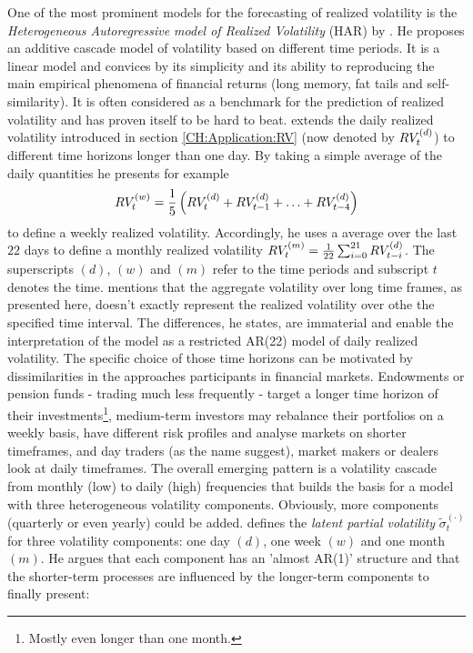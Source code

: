 One of the most prominent models for the forecasting of realized volatility is the \textit{Heterogeneous Autoregressive model of Realized Volatility} (HAR) by \cite{Corsi2009}. He proposes an additive cascade model of volatility based on different time periods. It is a linear model and convices by its simplicity and its ability to reproducing the main empirical phenomena of financial returns (long memory, fat tails and self-similarity). It is often considered as a benchmark for the prediction of realized volatility and has proven itself to be hard to beat. \cite{Corsi2009} extends the daily realized volatility introduced in section \ref{CH:Application:RV} (now denoted by $RV^{(d)}_t$) to different time horizons longer than one day. By taking a simple average of the daily quantities he presents for example
\begin{equation}
    RV^{(w)}_t = \frac{1}{5}\left(RV^{(d)}_t + RV^{(d)}_{t-1} + \hdots + RV^{(d)}_{t-4}\right)
\end{equation}
to define a weekly realized volatility. Accordingly, he uses a average over the last $22$ days to define a monthly realized volatility $RV^{(m)}_t = \frac{1}{22}\sum_{i=0}^{21} RV^{(d)}_{t-i}$. The superscripts $(d)$, $(w)$ and $(m)$ refer to the time periods and subscript $t$ denotes the time. \cite{Corsi2009} mentions that the aggregate volatility over long time frames, as presented here, doesn't exactly represent the realized volatility over othe the specified time interval. The differences, he states, are immaterial and enable the interpretation of the model as a restricted AR(22) model of daily realized volatility. The specific choice of those time horizons can be motivated by dissimilarities in the approaches participants in financial markets. Endowments or pension funds - trading much less frequently - target a longer time horizon of their investments\footnote{Mostly even longer than one month.}, medium-term investors may rebalance their portfolios on a weekly basis, have different risk profiles and analyse markets on shorter timeframes, and day traders (as the name suggest), market makers or dealers look at daily timeframes. 
The overall emerging pattern is a volatility cascade from monthly (low) to daily (high) frequencies that builds the basis for a model with three heterogeneous volatility components.
Obviously, more components (quarterly or even yearly) could be added.
\cite{Corsi2009} defines the \textit{latent partial volatility} $\tilde \sigma_t^{(\cdot)}$ for three volatility components: one day $(d)$, one week $(w)$ and one month $(m)$. He argues that each component has an 'almost AR(1)' structure and that the shorter-term processes are influenced by the longer-term components to finally present:

